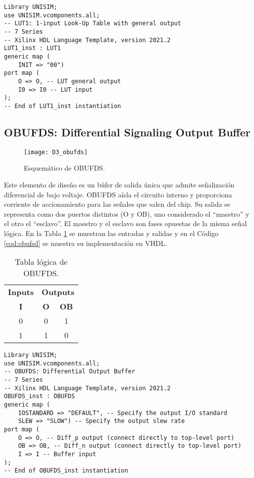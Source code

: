 \vspace{0.4cm}
\begin{lstlisting}[style = VHDL_TEXT, caption = Primitiva LUT1., label = cod:lut1]
Library UNISIM;
use UNISIM.vcomponents.all;
-- LUT1: 1-input Look-Up Table with general output
-- 7 Series
-- Xilinx HDL Language Template, version 2021.2
LUT1_inst : LUT1
generic map (
    INIT => "00")
port map (
    O => O, -- LUT general output
    I0 => I0 -- LUT input
);
-- End of LUT1_inst instantiation
\end{lstlisting}






	\subsection{OBUFDS: Differential Signaling Output Buffer}
	
	\begin{figure}[hbtp]
		\caption{Esquemático de OBUFDS.}
		\centering
		\texttt{[image: D3\_obufds]}
		\label{fig:D3_obufds}
	\end{figure}	
	
	Este elemento de diseño es un búfer de salida única que admite señalización diferencial de bajo voltaje. OBUFDS aísla el circuito interno y proporciona corriente de accionamiento para las señales que salen del chip. Su salida se representa como dos puertos distintos (O y OB), uno considerado el ``maestro'' y el otro el ``esclavo''. El maestro y el esclavo son fases opuestas de la misma señal lógica.  En la Tabla \ref{tab:obufsd} se muestran las entradas y salidas y en el Código \ref{cod:obufsd} se muestra su implementación en VHDL.

	
	\begin{table}[htbp]
		\centering
		\caption{Tabla lógica de OBUFDS.}
		\begin{tabular}{|c|cc|}
		\hline
		\textbf{Inputs} & \multicolumn{2}{c|}{\textbf{Outputs}} \\ 
		\textbf{I}      & \multicolumn{1}{c}{\textbf{O}}  & \textbf{OB} \\ \hline
		0      & \multicolumn{1}{c|}{0}  & 1  \\ \hline
		1      & \multicolumn{1}{c|}{1}  & 0  \\ \hline
		\end{tabular}
		\label{tab:obufsd}
	\end{table}


\vspace{0.4cm}
\begin{lstlisting}[style = VHDL_TEXT, caption = Primitiva OBUFDS., label = cod:obufsd]
Library UNISIM;
use UNISIM.vcomponents.all;
-- OBUFDS: Differential Output Buffer
-- 7 Series
-- Xilinx HDL Language Template, version 2021.2
OBUFDS_inst : OBUFDS
generic map (
    IOSTANDARD => "DEFAULT", -- Specify the output I/O standard
    SLEW => "SLOW") -- Specify the output slew rate
port map (
    O => O, -- Diff_p output (connect directly to top-level port)
    OB => OB, -- Diff_n output (connect directly to top-level port)
    I => I -- Buffer input
);
-- End of OBUFDS_inst instantiation
\end{lstlisting}



